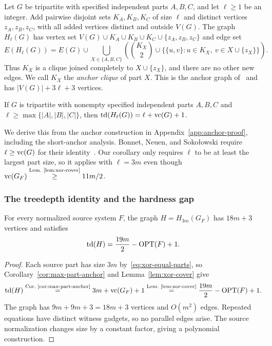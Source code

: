 Let $G$ be tripartite with specified independent parts $A,B,C$, and
let $\ell\ge1$ be an integer. Add pairwise disjoint sets
$K_A,K_B,K_C$ of size $\ell$ and distinct vertices $z_A,z_B,z_C$,
with all added vertices distinct and outside $V(G)$.
The graph $H_\ell(G)$ has vertex set
$V(G)\cup K_A\cup K_B\cup K_C\cup\{z_A,z_B,z_C\}$ and edge set
\[
 E(H_\ell(G))=E(G)\cup
 \bigcup_{X\in\{A,B,C\}}
 \left(\binom{K_X}{2}\cup
       \{\{u,v\}:u\in K_X,\ v\in X\cup\{z_X\}\}\right).
\]
Thus $K_X$ is a clique joined completely to $X\cup\{z_X\}$, and
there are no other new edges. We call $K_X$ the \emph{anchor clique}
of part $X$. This is the anchor graph of~\cite[Lemma~6]{BNS} and has
$|V(G)|+3\ell+3$ vertices.

\begin{corollary}\label{cor:max-part-anchor}
If $G$ is tripartite with nonempty specified independent parts $A,B,C$ and
$\ell\ge\max\{|A|,|B|,|C|\}$, then
$\operatorname{td}(H_\ell(G))=\ell+\operatorname{vc}(G)+1$.
\end{corollary}

We derive this from the anchor construction in Appendix~\ref{app:anchor-proof},
including the short-anchor analysis.
Bonnet, Neuen, and Soko\l owski require $\ell\geq\operatorname{vc}(G)$ for their
identity~\cite[Lemma~6]{BNS}. Our corollary only requires $\ell$ to be at
least the largest part size, so it applies with $\ell=3m$ even though
$\operatorname{vc}(G_F)\overset{\text{Lem.~\ref{lem:xor-cover}}}{\geq}11m/2$.

\subsubsection{The treedepth identity and the hardness gap}
\label{subsec:np-td-gap}

\begin{proposition}\label{prop:xor-treedepth-identity}
For every normalized source system $F$, the graph $H=H_{3m}(G_F)$
has $18m+3$ vertices and satisfies
\begin{equation}\label{eq:xor-treedepth-identity}
 \operatorname{td}(H)=\frac{19m}{2}-\operatorname{OPT}(F)+1.
\end{equation}
\end{proposition}

\begin{proof}
Each source part has size $3m$ by~\eqref{eq:xor-equal-parts}, so
Corollary~\ref{cor:max-part-anchor} and Lemma~\ref{lem:xor-cover} give
\[
 \operatorname{td}(H)
 \overset{\text{Cor.~\ref{cor:max-part-anchor}}}{=}3m+\operatorname{vc}(G_F)+1
 \overset{\text{Lem.~\ref{lem:xor-cover}}}{=}
 \frac{19m}{2}-\operatorname{OPT}(F)+1.
\]
The graph has $9m+9m+3=18m+3$ vertices and $O(m^2)$ edges.
Repeated equations have distinct witness gadgets, so no parallel
edges arise. The source normalization changes size by a constant
factor, giving a polynomial construction.
\end{proof}

